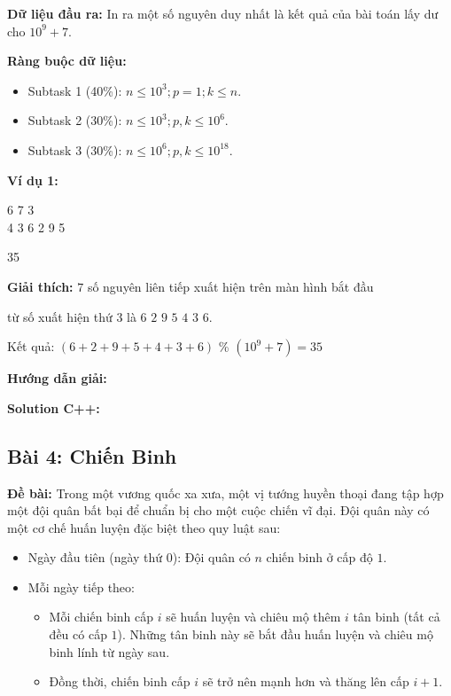 \documentclass[12pt]{scrartcl}  %
\begin{document}
\textbf{Dữ liệu đầu ra:}
In ra một số nguyên duy nhất là kết quả của bài toán lấy dư cho $10^9 + 7$.

\textbf{Ràng buộc dữ liệu:}
\begin{itemize}
    \item Subtask 1 (40\%): $n \leq 10^3; p = 1; k \leq n$.
    \item Subtask 2 (30\%): $n \leq 10^3; p, k \leq 10^6$.
    \item Subtask 3 (30\%): $n \leq 10^6; p, k \leq 10^{18}$.
\end{itemize}

\textbf{Ví dụ 1:}
\begin{tcolorbox}[colback=gray!5!white, colframe=blue!50!black, title=Input]
6 7 3\\
4 3 6 2 9 5
\end{tcolorbox}
\begin{tcolorbox}[colback=gray!5!white, colframe=green!50!black, title=Output]
35
\end{tcolorbox}

\textbf{Giải thích:}
$7$ số nguyên liên tiếp xuất hiện trên màn hình bắt đầu

từ số xuất hiện thứ $3$ là $6$ $2$ $9$ $5$ $4$ $3$ $6$.

Kết quả: $(6 + 2 + 9 + 5 + 4 + 3 + 6)$ \% $(10^9 + 7) = 35$

\textbf{Hướng dẫn giải:}

\textbf{Solution C++:}

\subsection{Bài 4: Chiến Binh}

\textbf{Đề bài:}
Trong một vương quốc xa xưa, một vị tướng huyền thoại đang tập hợp một đội quân bất bại để chuẩn
bị cho một cuộc chiến vĩ đại. Đội quân này có một cơ chế huấn luyện đặc biệt theo quy luật sau:
\begin{itemize}
    \item Ngày đầu tiên (ngày thứ $0$): Đội quân có $n$ chiến binh ở cấp độ $1$.
    \item Mỗi ngày tiếp theo: 
    \begin{itemize}
        \item Mỗi chiến binh cấp $i$ sẽ huấn luyện và chiêu mộ thêm $i$ tân binh (tất cả đều có cấp $1$).
Những tân binh này sẽ bắt đầu huấn luyện và chiêu mộ binh lính từ ngày sau.
        \item Đồng thời, chiến binh cấp $i$ sẽ trở nên mạnh hơn và thăng lên cấp $i + 1$.
    \end{itemize}
\end{itemize}
\end{document}
